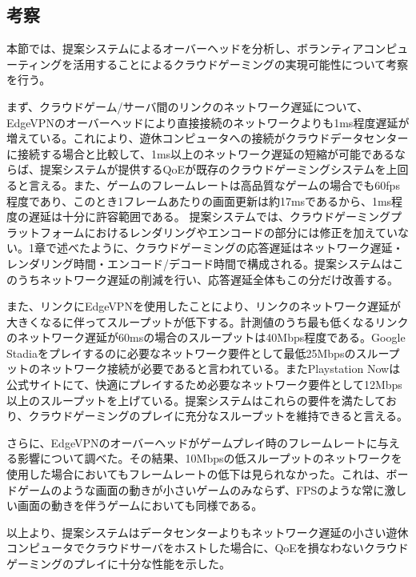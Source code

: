 \subsection{考察}
本節では、提案システムによるオーバーヘッドを分析し、ボランティアコンピューティングを活用することによるクラウドゲーミングの実現可能性について考察を行う。

まず、クラウドゲーム/サーバ間のリンクのネットワーク遅延について、EdgeVPNのオーバーヘッドにより直接接続のネットワークよりも1ms程度遅延が増えている。これにより、遊休コンピュータへの接続がクラウドデータセンターに接続する場合と比較して、1ms以上のネットワーク遅延の短縮が可能であるならば、提案システムが提供するQoEが既存のクラウドゲーミングシステムを上回ると言える。また、ゲームのフレームレートは高品質なゲームの場合でも60fps程度であり、このとき1フレームあたりの画面更新は約17msであるから、1ms程度の遅延は十分に許容範囲である。
提案システムでは、クラウドゲーミングプラットフォームにおけるレンダリングやエンコードの部分には修正を加えていない。1章で述べたように、クラウドゲーミングの応答遅延はネットワーク遅延・レンダリング時間・エンコード/デコード時間で構成される。提案システムはこのうちネットワーク遅延の削減を行い、応答遅延全体もこの分だけ改善する。

また、リンクにEdgeVPNを使用したことにより、リンクのネットワーク遅延が大きくなるに伴ってスループットが低下する。計測値のうち最も低くなるリンクのネットワーク遅延が60msの場合のスループットは40Mbps程度である。Google Stadiaをプレイするのに必要なネットワーク要件として最低25Mbpsのスループットのネットワーク接続が必要であると言われている\cite{stadia_band}。またPlaystation Nowは公式サイトにて、快適にプレイするため必要なネットワーク要件として12Mbps以上のスループットを上げている\cite{ps-now}。提案システムはこれらの要件を満たしており、クラウドゲーミングのプレイに充分なスループットを維持できると言える。

さらに、EdgeVPNのオーバーヘッドがゲームプレイ時のフレームレートに与える影響について調べた。その結果、10Mbpsの低スループットのネットワークを使用した場合においてもフレームレートの低下は見られなかった。これは、ボードゲームのような画面の動きが小さいゲームのみならず、FPSのような常に激しい画面の動きを伴うゲームにおいても同様である。

以上より、提案システムはデータセンターよりもネットワーク遅延の小さい遊休コンピュータでクラウドサーバをホストした場合に、QoEを損なわないクラウドゲーミングのプレイに十分な性能を示した。



